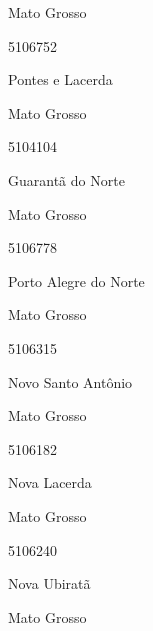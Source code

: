 \documentclass[
  letterpaper,
]{report}
\begin{document}
\n    

\n      

Mato Grosso

\n      

5106752

\n      

Pontes e Lacerda

\n    

\n    

\n      

Mato Grosso

\n      

5104104

\n      

Guarantã do Norte

\n    

\n    

\n      

Mato Grosso

\n      

5106778

\n      

Porto Alegre do Norte

\n    

\n    

\n      

Mato Grosso

\n      

5106315

\n      

Novo Santo Antônio

\n    

\n    

\n      

Mato Grosso

\n      

5106182

\n      

Nova Lacerda

\n    

\n    

\n      

Mato Grosso

\n      

5106240

\n      

Nova Ubiratã

\n    

\n    

\n      

Mato Grosso

\n      
\end{document}
